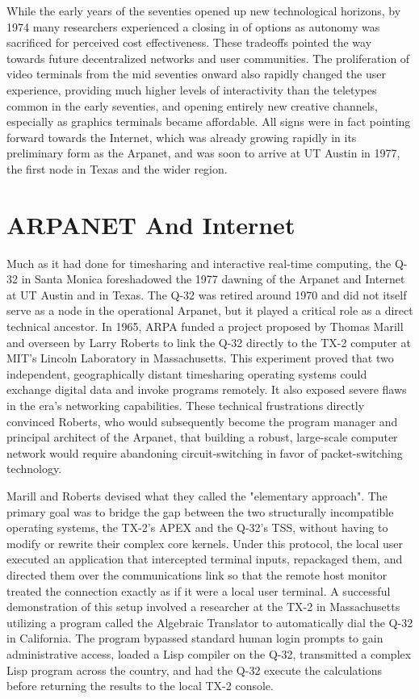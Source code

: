 While the early years of the seventies opened up new technological horizons, by 1974 many researchers experienced a closing in of options as autonomy was sacrificed for perceived cost effectiveness. These tradeoffs pointed the way towards future decentralized networks and user communities. The proliferation of video terminals from the mid seventies onward also rapidly changed the user experience, providing much higher levels of interactivity than the teletypes common in the early seventies, and opening entirely new creative channels, especially as graphics terminals became affordable. All signs were in fact pointing forward towards the Internet, which was already growing rapidly in its preliminary form as the Arpanet, and was soon to arrive at UT Austin in 1977, the first node in Texas and the wider region.

\section{ARPANET And Internet}

Much as it had done for timesharing and interactive real-time computing, the Q-32 in Santa Monica foreshadowed the 1977 dawning of the Arpanet and Internet at UT Austin and in Texas. The Q-32 was retired around 1970 and did not itself serve as a node in the operational Arpanet, but it played a critical role as a direct technical ancestor. In 1965, ARPA funded a project proposed by Thomas Marill and overseen by Larry Roberts to link the Q-32 directly to the TX-2 computer at MIT's Lincoln Laboratory in Massachusetts. This experiment proved that two independent, geographically distant timesharing operating systems could exchange digital data and invoke programs remotely. It also exposed severe flaws in the era's networking capabilities. These technical frustrations directly convinced Roberts, who would subsequently become the program manager and principal architect of the Arpanet, that building a robust, large-scale computer network would require abandoning circuit-switching in favor of packet-switching technology.

Marill and Roberts devised what they called the "elementary approach". The primary goal was to bridge the gap between the two structurally incompatible operating systems, the TX-2's APEX and the Q-32's TSS, without having to modify or rewrite their complex core kernels. Under this protocol, the local user executed an application that intercepted terminal inputs, repackaged them, and directed them over the communications link so that the remote host monitor treated the connection exactly as if it were a local user terminal. A successful demonstration of this setup involved a researcher at the TX-2 in Massachusetts utilizing a program called the Algebraic Translator to automatically dial the Q-32 in California. The program bypassed standard human login prompts to gain administrative access, loaded a Lisp compiler on the Q-32, transmitted a complex Lisp program across the country, and had the Q-32 execute the calculations before returning the results to the local TX-2 console.

